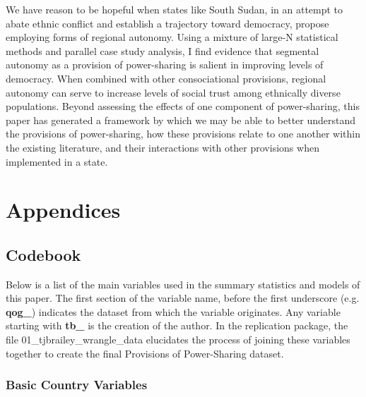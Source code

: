 \documentclass[12pt]{article}
\begin{document}
We have reason to be hopeful when states like South Sudan, in an attempt to abate ethnic conflict and establish a trajectory toward democracy, propose employing forms of regional autonomy. Using a mixture of large-N statistical methods and parallel case study analysis, I find evidence that segmental autonomy as a provision of power-sharing is salient in improving levels of democracy. When combined with other consociational provisions, regional autonomy can serve to increase levels of social trust among ethnically diverse populations. Beyond assessing the effects of one component of power-sharing, this paper has generated a framework by which we may be able to better understand the provisions of power-sharing, how these provisions relate to one another within the existing literature, and their interactions with other provisions when implemented in a state.

\pagebreak

\printbibliography
%
%

\pagebreak

\section{Appendices}
\subsection{Codebook}

Below is a list of the main variables used in the summary statistics and models of this paper. The first section of the variable name, before the first underscore (e.g. \textbf{qog\_}) indicates the dataset from which the variable originates. Any variable starting with \textbf{tb\_} is the creation of the author. In the replication package, the file 01\_tjbrailey\_wrangle\_data elucidates the process of joining these variables together to create the final Provisions of Power-Sharing dataset.  

\newlength\cbl
\newenvironment{codebook}[1][rob\_avprison1]{
	\settowidth{\cbl}{#1}
	\parskip1em plus .3em minus .2em
	\parindent0pt
	\def\code##1##2{{\bfseries ##1}\hfill
		\parbox[t]{\dimexpr\linewidth-15em-\cbl}{##2}\par}}{\noindent}

\singlespacing

\subsubsection{Basic Country Variables}
	
\end{document}
